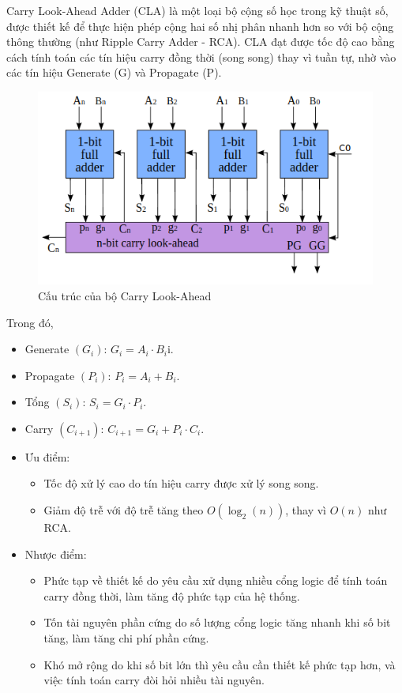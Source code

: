 Carry Look-Ahead Adder (CLA) là một loại bộ cộng số học trong kỹ thuật số, được thiết kế để thực hiện phép cộng hai số nhị phân nhanh hơn so với bộ cộng thông thường (như Ripple Carry Adder - RCA). CLA đạt được tốc độ cao bằng cách tính toán các tín hiệu carry đồng thời (song song) thay vì tuần tự, nhờ vào các tín hiệu Generate (G) và Propagate (P). 

\begin{figure}[H]
	\centering
	\includegraphics[width=0.5\linewidth]{./image/carry_look_ahead_structure.png}
	\caption{Cấu trúc của bộ Carry Look-Ahead}
	\label{f_carry look ahead structure}
\end{figure}

Trong đó,

\begin{itemize}[label = -]
	\item Generate $(G_{i})$: $G_{i} = A_{i} \cdot B_{i} $i.
	\item Propagate $(P_{i})$: $P_{i} = A_{i} + B_{i}$.
	\item Tổng $(S_{i})$: $S_{i} = G_{i} \cdot P_{i}$.
	\item Carry $(C_{i+1})$: $C_{i + 1} = G_{i} + P_{i}\cdot C_{i}$.
\end{itemize}

\begin{itemize}[label = -]
	\item Ưu điểm: 
	\begin{itemize}[label = +]
		\item Tốc độ xử lý cao do tín hiệu carry được xử lý song song.
		\item Giảm độ trễ với độ trễ tăng theo $O(\log_{2}(n))$, thay vì $O(n)$ như RCA.
	\end{itemize}
	\item Nhược điểm:
	\begin{itemize}[label = +]
		\item Phức tạp về thiết kế do yêu cầu xử dụng nhiều cổng logic để tính toán carry đồng thời, làm tăng độ phức tạp của hệ thống.
		\item Tốn tài nguyên phần cứng do số lượng cổng logic tăng nhanh khi số bit tăng, làm tăng chi phí phần cứng.
		\item Khó mở rộng do khi số bit lớn thì yêu cầu cần thiết kế phức tạp hơn, và việc tính toán carry đòi hỏi nhiều tài nguyên.
	\end{itemize}
\end{itemize}

